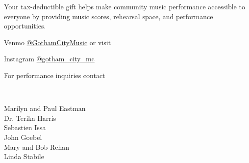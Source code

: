 \documentclass{article}[10pt]
\begin{document}
\begin{center}
\begin{minipage}{4in}
            \begin{center}
            {\textbf{}}
            \end{center}

            \vspace{-0.1in}

            \begin{small}
                Your tax-deductible gift helps make community music performance accessible to everyone by providing music scores, rehearsal space, and performance opportunities.\\
            \end{small}


            Venmo \href{https://account.venmo.com/u/GothamCityMusic}{@GothamCityMusic} or visit \textbf{}

            \begin{center}
            {\textbf{}}

                \faInstagram{}{}  Instagram  \href{https://www.instagram.com/gotham_city_mc/}{@gotham\_city\_mc}


                For performance inquiries contact
                    {\textbf{}}
            \end{center}

            \begin{center}
            {\textbf{}}
                \\

                \begin{small}
                    \vspace{-0.11in}
                    \begin{multicols*}{2}
                        Marilyn and Paul Eastman\\
                        Dr. Terika Harris\\
                        Sebastien Issa\\
                        John Goebel\\
                        Mary and Bob Rehan\\
                        Linda Stabile
                    \end{multicols*}
                \end{small}
            \end{center}

        \end{minipage}

    \end{center}
\end{document}
